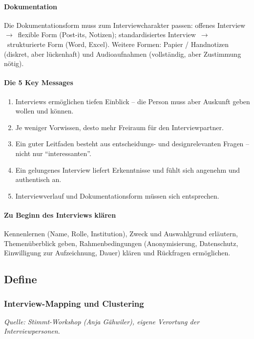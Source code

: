 \paragraph{Dokumentation}
Die Dokumentationsform muss zum Interviewcharakter passen: offenes
Interview~$\to$~flexible Form (Post-its, Notizen); standardisiertes
Interview~$\to$~strukturierte Form (Word, Excel). Weitere Formen: Papier /
Handnotizen (diskret, aber lückenhaft) und Audioaufnahmen (vollständig, aber
Zustimmung nötig).

\paragraph{Die 5 Key Messages}
\begin{enumerate}[nosep]
  \item Interviews ermöglichen tiefen Einblick -- die Person muss aber Auskunft geben wollen und können.
  \item Je weniger Vorwissen, desto mehr Freiraum für den Interviewpartner.
  \item Ein guter Leitfaden besteht aus entscheidungs- und designrelevanten Fragen -- nicht nur \enquote{interessanten}.
  \item Ein gelungenes Interview liefert Erkenntnisse und fühlt sich angenehm und authentisch an.
  \item Interviewverlauf und Dokumentationsform müssen sich entsprechen.
\end{enumerate}

\paragraph{Zu Beginn des Interviews klären}
Kennenlernen (Name, Rolle, Institution), Zweck und Auswahlgrund erläutern,
Themenüberblick geben, Rahmenbedingungen (Anonymisierung, Datenschutz,
Einwilligung zur Aufzeichnung, Dauer) klären und Rückfragen ermöglichen.

\clearpage
\pagecolor{anhangPastel}
\subsection{Define}

\subsubsection{Interview-Mapping und Clustering}
\label{anh:clustering}
\textit{Quelle: Stimmt-Workshop (Anja Gähwiler), eigene Verortung der Interviewpersonen.}

